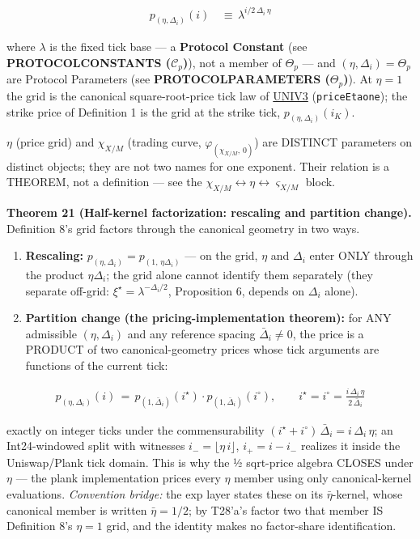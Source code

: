 \documentclass[11pt]{article}
\renewcommand{\_}{\textunderscore\allowbreak}
\begin{document}
\[
    \begin{aligned}
        p_{(\eta, \Delta_i)} (i) \, &\equiv \, \lambda^{i/2 \, \Delta_i \, \eta}
    \end{aligned}
\]

where \(\lambda\) is the fixed tick base --- a \textbf{Protocol Constant} (see \textbf{PROTOCOL\_CONSTANTS (\(\mathcal{C}_p\))}), not a member of \(\Theta_p\) --- and \((\eta, \Delta_i) = \Theta_p\) are Protocol Parameters (see \textbf{PROTOCOL\_PARAMETERS (\(\Theta_p\))}). At \(\eta = 1\) the grid is the canonical square-root-price tick law of \href{../refs/uniswap-v3-core.pdf}{UNI\_V3} (\texttt{priceEta\_one}); the strike price of Definition 1 is the grid at the strike tick, \(p_{(\eta,\Delta_i)}(i_K)\).

\(\eta\) (price grid) and \(\chi_{X/M}\) (trading curve, \(\varphi_{(\chi_{X/M},\,0)}\)) are DISTINCT parameters on distinct objects; they are not two names for one exponent. Their relation is a THEOREM, not a definition --- see the \(\chi_{X/M} \leftrightarrow \eta \leftrightarrow \varsigma_{X/M}\) block.

\textbf{Theorem 21 (Half-kernel factorization: rescaling and partition change).} Definition 8's grid factors through the canonical geometry in two ways.

\begin{enumerate}
\def\labelenumi{(\roman{enumi})}
\item
  \textbf{Rescaling:} \(p_{(\eta,\Delta_i)} = p_{(1,\,\eta\Delta_i)}\) --- on the grid, \(\eta\) and \(\Delta_i\) enter ONLY through the product \(\eta\Delta_i\); the grid alone cannot identify them separately (they separate off-grid: \(\xi^{\star} = \lambda^{-\Delta_i/2}\), Proposition 6, depends on \(\Delta_i\) alone).
\item
  \textbf{Partition change (the pricing-implementation theorem):} for ANY admissible \((\eta, \Delta_i)\) and any reference spacing \(\bar\Delta_i \neq 0\), the price is a PRODUCT of two canonical-geometry prices whose tick arguments are functions of the current tick:
\end{enumerate}

\[
    \begin{aligned}
        p_{(\eta,\Delta_i)}(i) \, = \, p_{(1,\bar\Delta_i)}(i^{\star}) \cdot p_{(1,\bar\Delta_i)}(i^{\circ}), \qquad i^{\star} = i^{\circ} = \frac{i\,\Delta_i\,\eta}{2\,\bar\Delta_i}
    \end{aligned}
\]

exactly on integer ticks under the commensurability \((i^{\star}+i^{\circ})\,\bar\Delta_i = i\,\Delta_i\,\eta\); an Int24-windowed split with witnesses \(i_- = \lfloor \eta\, i \rfloor\), \(i_+ = i - i_-\) realizes it inside the Uniswap/Plank tick domain. This is why the ½ sqrt-price algebra CLOSES under \(\eta\) --- the plank implementation prices every \(\eta\) member using only canonical-kernel evaluations. \emph{Convention bridge:} the exp layer states these on its \(\bar\eta\)-kernel, whose canonical member is written \(\bar\eta = 1/2\); by T28'a's factor two that member IS Definition 8's \(\eta = 1\) grid, and the identity makes no factor-share identification.
\end{document}
